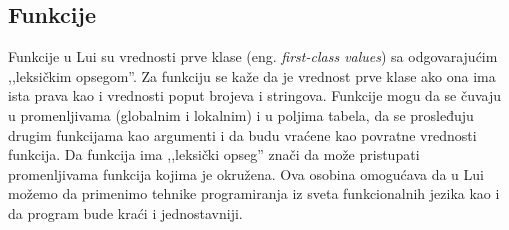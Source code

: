 \documentclass[a4paper]{article}
\begin{document}


\subsection{Funkcije}
\label{sec:funkcije}

Funkcije u Lui su vrednosti prve klase (eng. \textit{first-class values}) sa odgovarajućim ,,leksičkim opsegom''. Za funkciju se kaže da je vrednost prve klase ako ona ima ista prava kao i vrednosti poput brojeva i stringova. Funkcije mogu da se čuvaju u promenljivama (globalnim i lokalnim) i u poljima tabela, da se prosleđuju drugim funkcijama kao argumenti i da budu vraćene kao povratne vrednosti funkcija. Da funkcija ima ,,leksički opseg'' znači da može pristupati promenljivama funkcija kojima je okružena. Ova osobina omogućava da u Lui možemo da primenimo tehnike programiranja iz sveta funkcionalnih jezika kao i da program bude kraći i jednostavniji.
\end{document}

